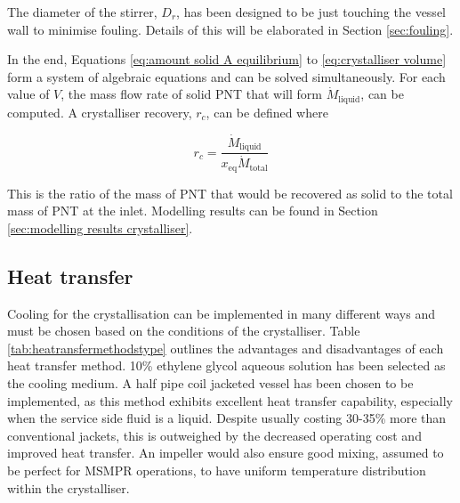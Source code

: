 \noindent The diameter of the stirrer, $D_r$, has been designed to be just touching the vessel wall to minimise fouling. Details of this will be elaborated in Section \ref{sec:fouling}.

In the end, Equations \ref{eq:amount solid A equilibrium} to \ref{eq:crystalliser volume} form a system of algebraic equations and can be solved simultaneously. For each value of $V$, the mass flow rate of solid PNT that will form $\dot{M}_{\mathrm{liquid}}$, can be computed. A crystalliser recovery, $r_c$, can be defined where

\begin{equation}
    r_c = \frac{\dot{M}_{\mathrm{liquid}}}{x_{\mathrm{eq}} \dot{M}_{\mathrm{total}}}
\end{equation}

\noindent This is the ratio of the mass of PNT that would be recovered as solid to the total mass of PNT at the inlet. Modelling results can be found in Section \ref{sec:modelling results crystalliser}.

\subsection{Heat transfer}\label{sec:heat transfer crystalliser}

Cooling for the crystallisation can be implemented in many different ways and must be chosen based on the conditions of the crystalliser. Table \ref{tab:heatransfermethodstype} outlines the advantages and disadvantages of each heat transfer method. 10\% ethylene glycol aqueous solution has been selected as the cooling medium. A half pipe coil jacketed vessel has been chosen to be implemented, as this method exhibits excellent heat transfer capability, especially when the service side fluid is a liquid. Despite usually costing 30-35\% more than conventional jackets, this is outweighed by the decreased operating cost and improved heat transfer. An impeller would also ensure good mixing, assumed to be perfect for MSMPR operations, to have uniform temperature distribution within the crystalliser. 

